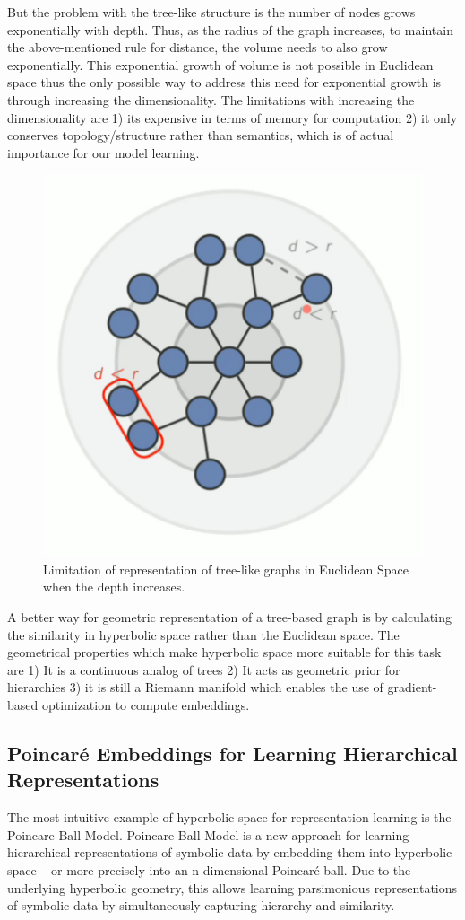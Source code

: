 \documentclass{article}
\begin{document}
But the problem with the tree-like structure is the number of nodes grows exponentially with depth. Thus, as the radius of the graph increases, to maintain the above-mentioned rule for distance, the volume needs to also grow exponentially. This exponential growth of volume is not possible in Euclidean space thus the only possible way to address this need for exponential growth is through increasing the dimensionality. The limitations with increasing the dimensionality are 1) its expensive in terms of memory for computation 2) it only conserves topology/structure rather than semantics, which is of actual importance for our model learning.
\begin{figure}
\centering
\includegraphics[width=0.5\linewidth]{tree_graphs_limitation.PNG}
\caption{Limitation of representation of tree-like graphs in Euclidean Space when the depth increases.}
\end{figure}


A better way for geometric representation of a tree-based graph is by calculating the similarity in hyperbolic space rather than the Euclidean space. The geometrical properties which make hyperbolic space more suitable for this task are 1) It is a continuous analog of trees 2) It acts as geometric prior for hierarchies 3) it is still a Riemann manifold which enables the use of gradient-based optimization to compute embeddings.

\subsection{Poincaré Embeddings for
Learning Hierarchical Representations}

The most intuitive example of hyperbolic space for representation learning is the Poincare Ball Model. Poincare Ball Model is a new approach for learning hierarchical representations of symbolic data by embedding them into hyperbolic space – or more precisely into an n-dimensional Poincaré ball. Due to the underlying hyperbolic geometry, this allows learning parsimonious representations of symbolic data by simultaneously capturing hierarchy and similarity.
\end{document}
